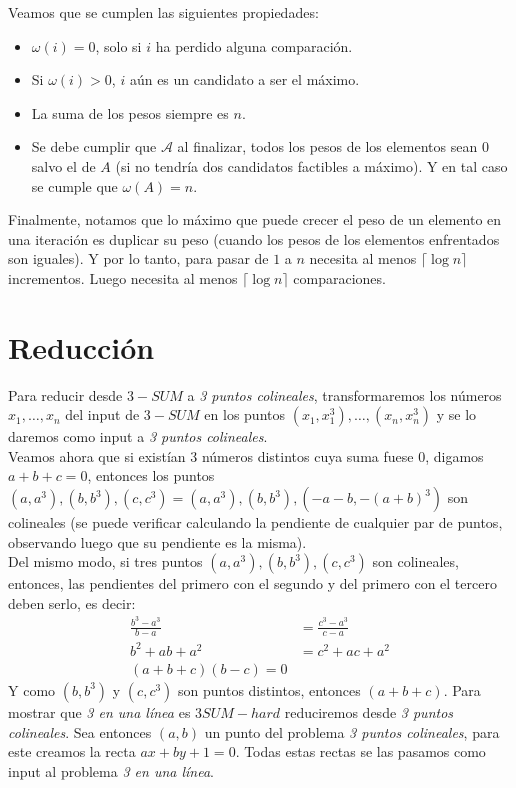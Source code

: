\documentclass[dcc,uchile]{fcfmcourse}
\theoremstyle{plain}
\theoremstyle{definition}
\begin{document}
\begin{problems}
Veamos que se cumplen las siguientes propiedades:
\begin{itemize}
    \item $\omega(i) = 0$, solo si $i$ ha perdido alguna comparación.
    \item Si $\omega(i) > 0$, $i$ aún es un candidato a ser el máximo.
    \item La suma de los pesos siempre es $n$.
    \item Se debe cumplir que $\mathcal{A}$ al finalizar,  todos los pesos de los elementos sean $0$ salvo el de $A$ (si no tendría dos candidatos factibles a máximo). Y en tal caso se cumple que $\omega(A) = n$.
\end{itemize}
Finalmente, notamos que lo máximo que puede crecer el peso de un elemento en una iteración es duplicar su peso (cuando los pesos de los elementos enfrentados son iguales). Y por lo tanto, para pasar de $1$ a $n$ necesita al menos $\lceil \log{n} \rceil$ incrementos. Luego necesita al menos $\lceil \log{n} \rceil$ comparaciones.
\section*{Reducción}
\problem Para reducir desde $3-SUM$ a \textit{3 puntos colineales}, transformaremos los números $x_{1}, \ldots , x_{n}$ del input de $3-SUM$ en los puntos $(x_{1}, x_{1}^3), \ldots, (x_{n}, x_{n}^3)$ y se lo daremos como input a \textit{3 puntos colineales}.\\
Veamos ahora que si existían 3 números distintos cuya suma fuese $0$, digamos $a+b+c=0$, entonces los puntos $(a, a^3), (b, b^3), (c, c^3) = (a, a^3), (b, b^3), (-a-b, -(a+b)^3)$ son colineales (se puede verificar calculando la pendiente de cualquier par de puntos, observando luego que su pendiente es la misma).\\
Del mismo modo, si tres puntos $(a, a^3), (b, b^3), (c, c^3)$ son colineales, entonces, las pendientes del primero con el segundo y del primero con el tercero deben serlo, es decir:
\begin{align*}
\frac{b^3 - a^3}{b - a} &= \frac{c^3 - a^3}{c - a}\\
b^2 + ab + a^2 &= c^2 + ac + a^2\\
(a + b + c)(b - c) = 0
\end{align*}
Y como $(b, b^3)$ y $(c, c^3)$ son puntos distintos, entonces $(a+ b + c)$.
\problem Para mostrar que \textit{3 en una línea} es $3SUM-hard$ reduciremos desde \textit{3 puntos colineales}. Sea entonces $(a,b)$ un punto del problema \textit{3 puntos colineales}, para este creamos la recta $ax+by+1 = 0$. Todas estas rectas se las pasamos como input al problema \textit{3 en una línea}.\\


\end{problems}
\end{document}
